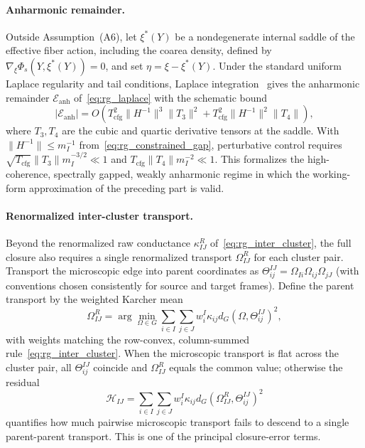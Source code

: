 \documentclass[11pt]{article}
\begin{document}
\paragraph{Anharmonic remainder.}
Outside Assumption~(A6), let $\xi^*(Y)$ be a nondegenerate internal saddle of the effective fiber action, including the coarea density, defined by $\nabla_\xi\Phi_s(Y,\xi^*(Y))=0$, and set $\eta=\xi-\xi^*(Y)$. Under the standard uniform Laplace regularity and tail conditions, Laplace integration~\cite{wong2001asymptotic} gives the anharmonic remainder $\mathcal{E}_{\mathrm{anh}}$ of~\eqref{eq:rg_laplace} with the schematic bound
\begin{equation}
|\mathcal{E}_{\mathrm{anh}}|
=O\left(T_{\mathrm{cfg}}^2\|H^{-1}\|^3\|T_3\|^2+T_{\mathrm{cfg}}^2\|H^{-1}\|^2\|T_4\|\right),
\end{equation}
where $T_3,T_4$ are the cubic and quartic derivative tensors at the saddle. With $\|H^{-1}\|\leq m_I^{-1}$ from~\eqref{eq:rg_constrained_gap}, perturbative control requires $\sqrt{T_{\mathrm{cfg}}}\|T_3\|m_I^{-3/2}\ll1$ and $T_{\mathrm{cfg}}\|T_4\|m_I^{-2}\ll1$. This formalizes the high-coherence, spectrally gapped, weakly anharmonic regime in which the working-form approximation of the preceding part is valid.

\paragraph{Renormalized inter-cluster transport.}
Beyond the renormalized raw conductance $\kappa_{IJ}^R$ of~\eqref{eq:rg_inter_cluster}, the full closure also requires a single renormalized transport $\Omega_{IJ}^R$ for each cluster pair. Transport the microscopic edge into parent coordinates as $\Theta_{ij}^{IJ} = \Omega_{Ii}\Omega_{ij}\Omega_{jJ}$ (with conventions chosen consistently for source and target frames). Define the parent transport by the weighted Karcher mean
\begin{equation}
\Omega_{IJ}^R = \arg\min_{\Omega \in G} \sum_{i \in I}\sum_{j \in J} w_i^I \kappa_{ij} d_G(\Omega, \Theta_{ij}^{IJ})^2,
\end{equation}
with weights matching the row-convex, column-summed rule~\eqref{eq:rg_inter_cluster}.
When the microscopic transport is flat across the cluster pair, all $\Theta_{ij}^{IJ}$ coincide and $\Omega_{IJ}^R$ equals the common value; otherwise the residual
\begin{equation}
\mathcal{H}_{IJ} = \sum_{i \in I}\sum_{j \in J} w_i^I \kappa_{ij} d_G(\Omega_{IJ}^R, \Theta_{ij}^{IJ})^2
\end{equation}
quantifies how much pairwise microscopic transport fails to descend to a single parent-parent transport. This is one of the principal closure-error terms.
\end{document}
